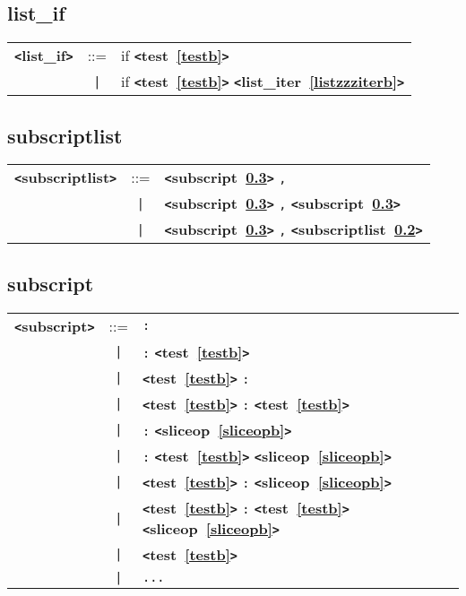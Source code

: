 \documentclass[12pt]{article}
\begin{document}

\subsection{list\_if}
\label{listzzzifb}
\begin{tabular}{lcl}
{\bf \verb+<+list\_if\verb+>+} & ::=  & if {\bf \verb+<+test~\ref{testb}\verb+>+}  \\
 & \verb+|+  & if {\bf \verb+<+test~\ref{testb}\verb+>+}  {\bf \verb+<+list\_iter~\ref{listzzziterb}\verb+>+}  \\
\end{tabular}

\subsection{subscriptlist}
\label{subscriptlistb}
\begin{tabular}{lcl}
{\bf \verb+<+subscriptlist\verb+>+} & ::=  & {\bf \verb+<+subscript~\ref{subscriptb}\verb+>+}  \verb|,| \\
 & \verb+|+  & {\bf \verb+<+subscript~\ref{subscriptb}\verb+>+}  \verb|,| {\bf \verb+<+subscript~\ref{subscriptb}\verb+>+}  \\
 & \verb+|+  & {\bf \verb+<+subscript~\ref{subscriptb}\verb+>+}  \verb|,| {\bf \verb+<+subscriptlist~\ref{subscriptlistb}\verb+>+}  \\
\end{tabular}

\subsection{subscript}
\label{subscriptb}
\begin{tabular}{lcl}
{\bf \verb+<+subscript\verb+>+} & ::=  & \verb|:| \\
 & \verb+|+  & \verb|:| {\bf \verb+<+test~\ref{testb}\verb+>+}  \\
 & \verb+|+  & {\bf \verb+<+test~\ref{testb}\verb+>+}  \verb|:| \\
 & \verb+|+  & {\bf \verb+<+test~\ref{testb}\verb+>+}  \verb|:| {\bf \verb+<+test~\ref{testb}\verb+>+}  \\
 & \verb+|+  & \verb|:| {\bf \verb+<+sliceop~\ref{sliceopb}\verb+>+}  \\
 & \verb+|+  & \verb|:| {\bf \verb+<+test~\ref{testb}\verb+>+}  {\bf \verb+<+sliceop~\ref{sliceopb}\verb+>+}  \\
 & \verb+|+  & {\bf \verb+<+test~\ref{testb}\verb+>+}  \verb|:| {\bf \verb+<+sliceop~\ref{sliceopb}\verb+>+}  \\
 & \verb+|+  & {\bf \verb+<+test~\ref{testb}\verb+>+}  \verb|:| {\bf \verb+<+test~\ref{testb}\verb+>+}  {\bf \verb+<+sliceop~\ref{sliceopb}\verb+>+}  \\
 & \verb+|+  & {\bf \verb+<+test~\ref{testb}\verb+>+}  \\
 & \verb+|+  & \verb|...| \\
\end{tabular}
\end{document}
